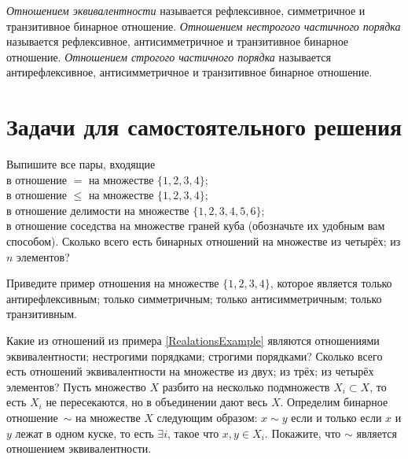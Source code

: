 \documentclass[a4paper,12pt]{article}
\begin{document}
     \emph{Отношением эквивалентности} называется рефлексивное, симметричное и транзитивное бинарное отношение.
     \emph{Отношением нестрогого частичного порядка} называется рефлексивное, антисимметричное и транзитивное бинарное отношение. \emph{Отношением строгого частичного порядка} называется антирефлексивное, антисимметричное и транзитивное бинарное отношение.
    
    \section{Задачи для самостоятельного решения}
    \problemw Выпишите все пары, входящие \\
    \sub в отношение $=$ на множестве $\{1,2,3,4\}$; \\
    \sub в отношение $\leq$ на множестве $\{1,2,3,4\}$; \\
    \sub в отношение делимости на множестве $\{1,2,3,4,5,6\}$; \\
    \sub в отношение соседства на множестве граней куба (обозначьте их удобным вам способом).
    \problemw Сколько всего есть бинарных отношений на множестве \sub из четырёх;  из $n$ элементов?
    
    \problem Приведите пример отношения на множестве $\{1,2,3,4\}$, которое является \sub только антирефлексивным; \sub только симметричным; \sub только антисимметричным; \sub только транзитивным.
    
    \problem Какие из отношений из примера \ref{RealationsExample} являются \sub отношениями эквивалентности; \sub нестрогими порядками; \sub строгими порядками?
    \problemw Сколько всего есть отношений эквивалентности на множестве \sub из двух; \sub из трёх;  из четырёх элементов?
    \problem Пусть множество $X$ разбито на несколько подмножеств $X_i \subset X$, то есть $X_i$ не пересекаются, но в объединении дают весь $X$. Определим бинарное отношение~$\sim$ на множестве $X$ следующим образом: $x \sim y$ если и только если $x$ и $y$ лежат в одном куске, то есть $\exists i$, такое что $x, y \in X_i$. Покажите, что $\sim$ является отношением эквивалентности.
\end{document}
